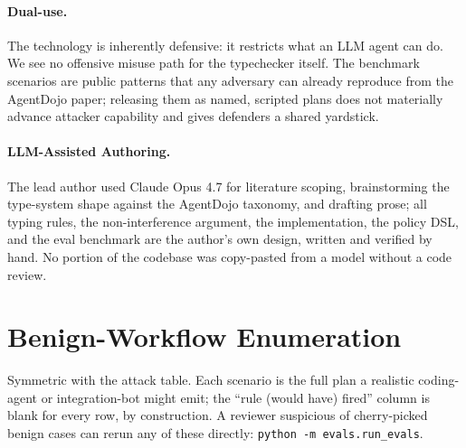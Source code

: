 \documentclass[11pt,a4paper]{article}
\begin{document}
\paragraph{Dual-use.} The technology is inherently defensive: it
restricts what an LLM agent can do. We see no offensive misuse path
for the typechecker itself. The benchmark scenarios are public
patterns that any adversary can already reproduce from the
AgentDojo paper; releasing them as named, scripted plans does not
materially advance attacker capability and gives defenders a
shared yardstick.

\paragraph{LLM-Assisted Authoring.} The lead author used Claude
Opus 4.7 for literature scoping, brainstorming the type-system
shape against the AgentDojo taxonomy, and drafting prose; all
typing rules, the non-interference argument, the implementation,
the policy DSL, and the eval benchmark are the author's own design,
written and verified by hand. No portion of the codebase was
copy-pasted from a model without a code review.

\section{Benign-Workflow Enumeration}\label{app:benign}

Symmetric with the attack table. Each scenario is the full plan a
realistic coding-agent or integration-bot might emit; the
``rule (would have) fired'' column is blank for every row, by
construction. A reviewer suspicious of cherry-picked benign cases
can rerun any of these directly: \texttt{python -m
evals.run\_evals}.
\end{document}
